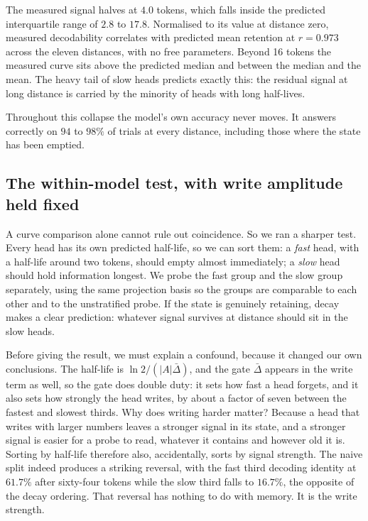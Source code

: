 \documentclass[10pt]{article}
\begin{document}
The measured signal halves at $4.0$ tokens, which falls inside the predicted
interquartile range of $2.8$ to $17.8$. Normalised to its value at distance
zero, measured decodability correlates with predicted mean retention at
$r = 0.973$ across the eleven distances, with no free parameters. Beyond 16
tokens the measured curve sits above the predicted median and between the
median and the mean. The heavy tail of slow heads predicts exactly this: the
residual signal at long distance is carried by the minority of heads with long
half-lives.



Throughout this collapse the model's own accuracy never moves. It answers
correctly on $94$ to $98\%$ of trials at every distance, including those where
the state has been emptied.

\subsection{The within-model test, with write amplitude held fixed}
\label{sec:strata}

A curve comparison alone cannot rule out coincidence. So we ran a sharper
test. Every head has its own predicted half-life, so we can sort them: a
\emph{fast} head, with a half-life around two tokens, should empty almost
immediately; a \emph{slow} head should hold information longest. We probe the
fast group and the slow group separately, using the same projection basis so
the groups are comparable to each other and to the unstratified probe. If the
state is genuinely retaining, decay makes a clear prediction: whatever signal
survives at distance should sit in the slow heads.

Before giving the result, we must explain a confound, because it changed our
own conclusions. The half-life is $\ln 2/(|A|\bar{\Delta})$, and the gate
$\bar{\Delta}$ appears in the write term as well, so the gate does double
duty: it sets how fast a head forgets, and it also sets how strongly the head
writes, by about a factor of seven between the fastest and slowest thirds.
Why does writing harder matter? Because a head that writes with larger
numbers leaves a stronger signal in its state, and a stronger signal is
easier for a probe to read, whatever it contains and however old it is.
Sorting by half-life therefore also, accidentally, sorts by signal strength.
The naive split indeed produces a striking reversal, with the fast third
decoding identity at $61.7\%$ after sixty-four tokens while the slow third
falls to $16.7\%$, the opposite of the decay ordering. That reversal has
nothing to do with memory. It is the write strength.
\end{document}
